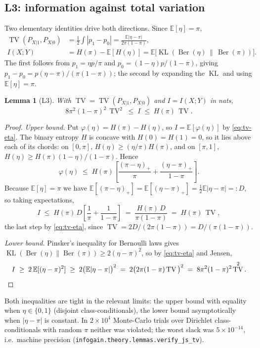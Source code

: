 \documentclass[11pt]{article}
\newtheorem{lemma}{Lemma}
\theoremstyle{definition}
\theoremstyle{remark}
\DeclareMathOperator{\KL}{KL}
\DeclareMathOperator{\TV}{TV}
\DeclareMathOperator{\Ber}{Ber}
\newcommand{\E}{\mathbb{E}}
\begin{document}
\subsection{L3: information against total variation}

Two elementary identities drive both directions. Since $\E[\eta]=\pi$,
\begin{equation}
\label{eq:tv-eta}
\begin{aligned}
\TV(P_{X|1},P_{X|0}) &= \tfrac12\!\int\!|p_1-p_0|
  = \frac{\E|\eta-\pi|}{2\pi(1-\pi)}, \\
I(X;Y) &= H(\pi)-\E[H(\eta)]
  = \E\big[\KL(\Ber(\eta)\,\|\,\Ber(\pi))\big].
\end{aligned}
\end{equation}
The first follows from $p_1=\eta p/\pi$ and $p_0=(1-\eta)p/(1-\pi)$, giving
$p_1-p_0=p(\eta-\pi)/(\pi(1-\pi))$; the second by expanding the $\KL$ and using
$\E[\eta]=\pi$.

\begin{lemma}[L3]
\label{lem:jstv}
With $\TV=\TV(P_{X|1},P_{X|0})$ and $I=I(X;Y)$ in nats,
\[
8\pi^2(1-\pi)^2\,\TV^2 \;\le\; I \;\le\; H(\pi)\,\TV .
\]
\end{lemma}

\begin{proof}
\emph{Upper bound.} Put $\varphi(\eta)=H(\pi)-H(\eta)$, so $I=\E[\varphi(\eta)]$
by \eqref{eq:tv-eta}. The binary entropy $H$ is concave with $H(0)=H(1)=0$, so it
lies above each of its chords: on $[0,\pi]$, $H(\eta)\ge (\eta/\pi)H(\pi)$, and
on $[\pi,1]$, $H(\eta)\ge H(\pi)(1-\eta)/(1-\pi)$. Hence
\[
\varphi(\eta)\;\le\; H(\pi)\left[\frac{(\pi-\eta)_+}{\pi}+\frac{(\eta-\pi)_+}{1-\pi}\right].
\]
Because $\E[\eta]=\pi$ we have $\E[(\pi-\eta)_+]=\E[(\eta-\pi)_+]=\tfrac12\E|\eta-\pi|=:D$,
so taking expectations,
\[
I \;\le\; H(\pi)\,D\left[\frac1\pi+\frac1{1-\pi}\right]
  \;=\; \frac{H(\pi)\,D}{\pi(1-\pi)} \;=\; H(\pi)\,\TV,
\]
the last step by \eqref{eq:tv-eta}, since $\TV=2D/(2\pi(1-\pi))=D/(\pi(1-\pi))$.

\emph{Lower bound.} Pinsker's inequality for Bernoulli laws gives
$\KL(\Ber(\eta)\|\Ber(\pi))\ge 2(\eta-\pi)^2$, so by \eqref{eq:tv-eta} and
Jensen,
\[
I \;\ge\; 2\,\E[(\eta-\pi)^2]\;\ge\;2\big(\E|\eta-\pi|\big)^2
  \;=\;2\big(2\pi(1-\pi)\TV\big)^2 \;=\; 8\pi^2(1-\pi)^2\TV^2 . \qedhere
\]
\end{proof}

Both inequalities are tight in the relevant limits: the upper bound with equality
when $\eta\in\{0,1\}$ (disjoint class-conditionals), the lower bound
asymptotically when $|\eta-\pi|$ is constant. In $2\times10^{4}$ Monte-Carlo
trials over Dirichlet class-conditionals with random $\pi$ neither was violated;
the worst slack was $5\times10^{-14}$, i.e.\ machine precision
(\texttt{infogain.theory.lemmas.verify\_js\_tv}).
\end{document}
